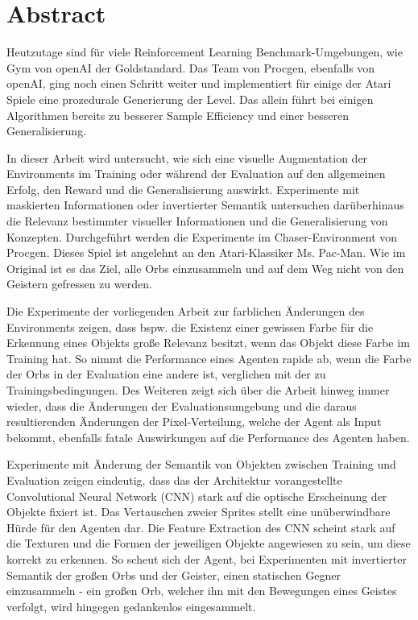

\section*{Abstract}
\pagestyle{empty}
Heutzutage sind für viele Reinforcement Learning Benchmark-Umgebungen, wie Gym \cite{brockman2016openAI_gym} von openAI der Goldstandard. Das Team von Procgen, ebenfalls von openAI, ging noch einen Schritt weiter und implementiert für einige der Atari Spiele eine prozedurale Generierung der Level. Das allein führt bei einigen Algorithmen bereits zu besserer Sample Efficiency und einer besseren Generalisierung. 

In dieser Arbeit wird untersucht, wie sich eine visuelle Augmentation der Environments im Training oder während der Evaluation auf den allgemeinen Erfolg, den Reward und die Generalisierung auswirkt. Experimente mit maskierten Informationen oder invertierter Semantik untersuchen darüberhinaus die Relevanz bestimmter visueller Informationen und die Generalisierung von Konzepten.
Durchgeführt werden die Experimente im Chaser-Environment von Procgen. Dieses Spiel ist angelehnt an den Atari-Klassiker \dq Ms. Pac-Man\dq. Wie im Original ist es das Ziel, alle Orbs einzusammeln und auf dem Weg nicht von den Geistern gefressen zu werden.

Die Experimente der vorliegenden Arbeit zur farblichen Änderungen des Environments zeigen, dass bspw. die Existenz einer gewissen Farbe für die Erkennung eines Objekts große Relevanz besitzt, wenn das Objekt diese Farbe im Training hat. So nimmt die Performance eines Agenten rapide ab, wenn die Farbe der Orbs in der Evaluation eine andere ist, verglichen mit der zu Trainingsbedingungen. Des Weiteren zeigt sich über die Arbeit hinweg immer wieder, dass die Änderungen der Evaluationsumgebung und die daraus resultierenden Änderungen der Pixel-Verteilung, welche der Agent als Input bekommt, ebenfalls fatale Auswirkungen auf die Performance des Agenten haben. 

Experimente mit Änderung der Semantik von Objekten zwischen Training und Evaluation zeigen eindeutig, dass das der Architektur vorangestellte Convolutional Neural Network (CNN) stark auf die optische Erscheinung der Objekte fixiert ist. Das Vertauschen zweier Sprites stellt eine unüberwindbare Hürde für den Agenten dar. Die Feature Extraction des CNN scheint stark auf die Texturen und die Formen der jeweiligen Objekte angewiesen zu sein, um diese korrekt zu erkennen. So scheut sich der Agent, bei Experimenten mit invertierter Semantik der großen Orbs und der Geister, einen statischen Gegner einzusammeln - ein großen Orb, welcher ihn mit den Bewegungen eines Geistes verfolgt, wird hingegen gedankenlos eingesammelt. 
